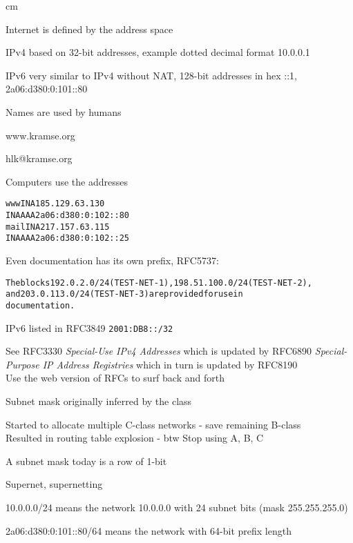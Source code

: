 \documentclass[Screen16to9,17pt]{foils}
\begin{document}

 cm

\begin{list2}
\item Internet is defined by the address space
\item IPv4 based on 32-bit addresses, example dotted decimal format 10.0.0.1
\item IPv6 very similar to IPv4 without NAT, 128-bit addresses in hex ::1, 2a06:d380:0:101::80
\end{list2}



Names are used by humans
\begin{center}\hlkbig
www.kramse.org

hlk@kramse.org
\end{center}

Computers use the addresses

\begin{alltt}
www     IN      A       185.129.63.130
        IN      AAAA    2a06:d380:0:102::80
mail    IN      A       217.157.63.115
        IN      AAAA    2a06:d380:0:102::25
\end{alltt}






Even documentation has its own prefix, RFC5737:
\begin{alltt}
The blocks 192.0.2.0/24 (TEST-NET-1), 198.51.100.0/24 (TEST-NET-2),
and 203.0.113.0/24 (TEST-NET-3) are provided for use in
documentation.
\end{alltt}

IPv6 listed in RFC3849 \verb+2001:DB8::/32+

See RFC3330 \emph{Special-Use IPv4 Addresses} which is updated by
RFC6890 \emph{Special-Purpose IP Address Registries} which in turn is updated by RFC8190\\
Use the web version of RFCs to surf back and forth 




\begin{list2}
\item Subnet mask originally inferred by the class
\item Started to allocate multiple C-class networks - save remaining B-class\\
Resulted in routing table explosion - btw Stop using A, B, C
\item A subnet mask today is a row of 1-bit
\item Supernet, supernetting
\item 10.0.0.0/24 means the network 10.0.0.0 with 24 subnet bits (mask 255.255.255.0)
\item 2a06:d380:0:101::80/64 means the network with 64-bit prefix length
\end{list2}
\end{document}
